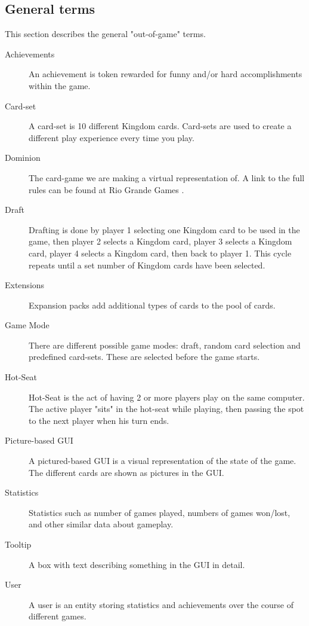 \documentclass[12pt,a4paper,notitlepage]{article}
\begin{document}
\subsection{General terms}
This section describes the general "out-of-game" terms.
\begin{description}
\item[Achievements] An achievement is token rewarded for funny and/or hard accomplishments within the game.
\item[Card-set] A card-set is 10 different Kingdom cards. Card-sets are used to create a different play experience every time you play.
\item[Dominion] The card-game we are making a virtual representation of. A link to the full rules can be found at Rio Grande Games \cite{dominionRules}.
\item[Draft] Drafting is done by player 1 selecting one Kingdom card to be used in the game, then player 2 selects a Kingdom card, player 3 selects a Kingdom card, player 4 selects a Kingdom card, then back to player 1. This cycle repeats until a set number of Kingdom cards have been selected.
\item[Extensions] Expansion packs add additional types of cards to the pool of cards.
\item[Game Mode] There are different possible game modes: draft, random card selection and predefined card-sets. These are selected before the game starts.
\item[Hot-Seat] Hot-Seat is the act of having 2 or more players play on the same computer. The active player "sits" in the hot-seat while playing, then passing the spot to the next player when his turn ends.
\item[Picture-based GUI] A pictured-based GUI is a visual representation of the state of the game. The different cards are shown as pictures in the GUI.
\item[Statistics] Statistics such as number of games played, numbers of games won/lost, and other similar data about gameplay.
\item[Tooltip] A box with text describing something in the GUI in detail.
\item[User] A user is an entity storing statistics and achievements over the course of different games.
\end{description}
\end{document}

